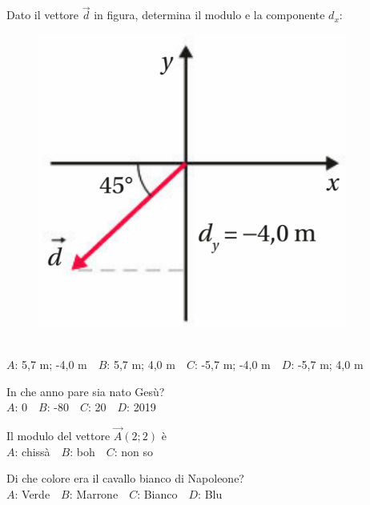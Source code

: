 \mcquestionheader Dato il vettore $\vec{d}$ in figura, determina il modulo e la componente $d_x$: \begin{figure}[h!]   \begin{center}     \includegraphics[scale=0.35]{vettored.png}   \end{center} \end{figure}\\
{$A$}: 5,7 m; -4,0 m\ \ {$B$}: 5,7 m; 4,0 m\ \ {$C$}: -5,7 m; -4,0 m\ \ {$D$}: -5,7 m; 4,0 m\ \ 

\mcquestionfooter



\def\mcquestionnumber{5}


\mcquestionheader In che anno pare sia nato Gesù?\\
{$A$}: 0\ \ {$B$}: -80\ \ {$C$}: 20\ \ {$D$}: 2019\ \ 

\mcquestionfooter



\def\mcquestionnumber{6}


\mcquestionheader Il modulo del vettore $\vec{A}(2;2)$ è\\
{$A$}: chissà\ \ {$B$}: boh\ \ {$C$}: non so\ \ 

\mcquestionfooter



\def\mcquestionnumber{7}


\mcquestionheader Di che colore era il cavallo bianco di Napoleone?\\
{$A$}: Verde\ \ {$B$}: Marrone\ \ {$C$}: Bianco\ \ {$D$}: Blu\ \ 

\mcquestionfooter



